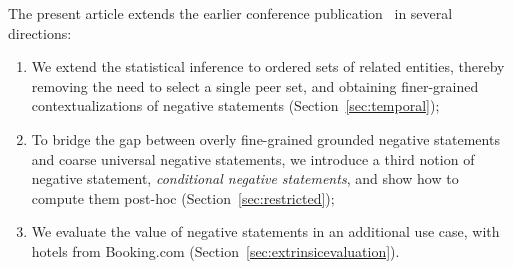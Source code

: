 The present article extends the earlier conference publication~\cite{negationakbc} in several directions:

\begin{enumerate}
    \item We extend the statistical inference to ordered sets of related entities, thereby removing the need to select a single peer set, and obtaining finer-grained contextualizations of negative statements (Section~\ref{sec:temporal}); 
    \item To bridge the gap between overly fine-grained groun\-ded negative statements and coarse universal negative statements, %
    we introduce a third notion of negative statement, \emph{conditional negative statements}, and show how to compute them post-hoc (Section~\ref{sec:restricted});
    \item We evaluate the value of negative statements in an additional use case, with hotels from Booking.com (Section~\ref{sec:extrinsicevaluation}).
\end{enumerate}
